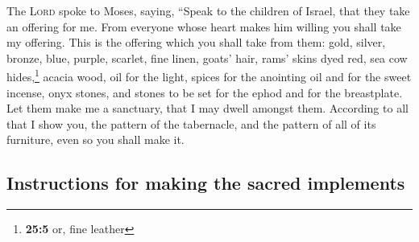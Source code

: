  The \textsc{Lord} spoke to Moses, saying, 
``Speak to the children of Israel, that they take an offering for me.
From everyone whose heart makes him willing you shall take my offering.
 This is the offering which you shall take from them:
gold, silver, bronze,  blue, purple, scarlet, fine linen,
goats' hair,  rams' skins dyed red, sea cow
hides,\footnote{\textbf{25:5} or, fine leather} acacia wood,
 oil for the light, spices for the anointing oil and for
the sweet incense,  onyx stones, and stones to be set for
the ephod and for the breastplate.  Let them make me a
sanctuary, that I may dwell amongst them.  According to
all that I show you, the pattern of the tabernacle, and the pattern of
all of its furniture, even so you shall make it.

\hypertarget{instructions-for-making-the-sacred-implements}{%
\subsection{Instructions for making the sacred
implements}\label{instructions-for-making-the-sacred-implements}}

